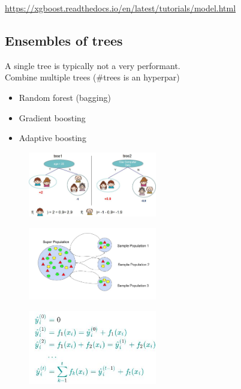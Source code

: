 \url{https://xgboost.readthedocs.io/en/latest/tutorials/model.html}


\subsection{Ensembles of trees}

A single tree is typically not a very performant.\\
Combine multiple trees (\#trees is an hyperpar)
\begin{itemize}
	\item Random forest (bagging)
	\item Gradient boosting
	\item Adaptive boosting
\end{itemize}

\begin{figure}[ht]
	\centering
	\includegraphics[width=0.5\textwidth]{figure_ml/trees.png}
\end{figure}
\FloatBarrier

\begin{figure}[ht]
	\centering
	\includegraphics[width=0.5\textwidth]{figure_ml/bagging.png}
\end{figure}
\FloatBarrier

\begin{figure}[ht]
	\centering
	\includegraphics[width=0.5\textwidth]{figure_ml/g_b.png}
\end{figure}
\FloatBarrier

